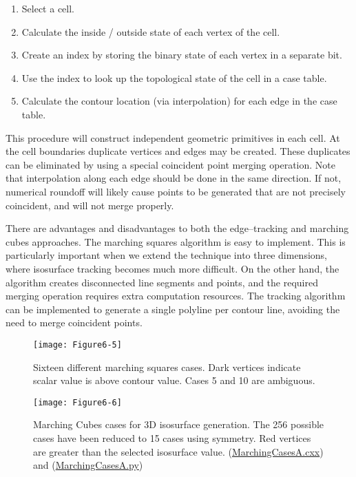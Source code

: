 \begin {enumerate}

\item Select a cell.

\item Calculate the inside / outside state of each vertex of the cell.

\item Create an index by storing the binary state of each vertex in a separate bit.

\item Use the index to look up the topological state of the cell in a case
table.

\item Calculate the contour location (via interpolation) for each edge in  the case table.

\end{enumerate}

This procedure will construct independent geometric primitives in each cell. At the cell boundaries duplicate vertices and edges may be created. These duplicates can be eliminated by using a special coincident point merging operation. Note that interpolation along each edge should be done in the same direction. If not, numerical roundoff will likely cause points to be generated that are not precisely coincident, and will not merge properly.

There are advantages and disadvantages to both the edge--tracking and marching cubes approaches. The marching squares algorithm is easy to implement. This is particularly important when we extend the technique into three dimensions, where isosurface tracking becomes much more difficult. On the other hand, the algorithm creates disconnected line segments and points, and the required merging operation requires extra computation resources. The tracking algorithm can be implemented to generate a single polyline per contour line, avoiding the need to merge coincident points.

\begin{figure}[!htb]
\centering
\texttt{[image: Figure6-5]}\\
\caption{ Sixteen different marching squares cases. Dark vertices indicate scalar value is above contour value. Cases 5 and 10 are ambiguous.}
\label{fig:Figure6-5}
\end{figure}


\begin{figure}[!htb]
	\centering
	\texttt{[image: Figure6-6]}\\
	\caption{Marching Cubes cases for 3D isosurface generation. The 256 possible cases have been reduced to 15 cases using symmetry. Red vertices are greater than the selected isosurface value. (\href{https://lorensen.github.io/VTKExamples/site/Cxx/VisualizationAlgorithms/MarchingCasesA/}{MarchingCasesA.cxx}) and (\href{https://lorensen.github.io/VTKExamples/site/Python/VisualizationAlgorithms/MarchingCasesA/}{MarchingCasesA.py})}
	\label{fig:Figure6-6}
\end{figure}


